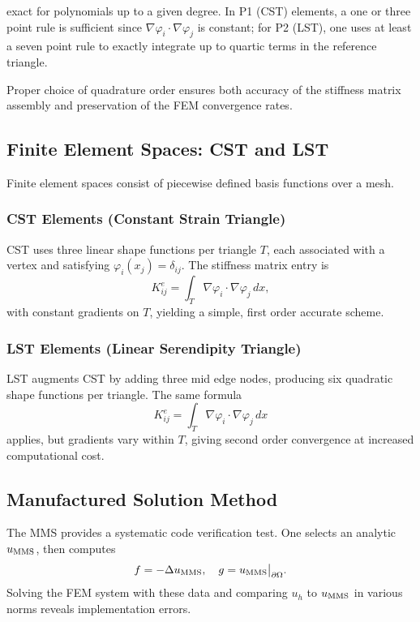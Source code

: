 exact for polynomials up to a given degree.  In P1 (CST) elements, a one or three point rule is sufficient since $\nabla\varphi_i\cdot\nabla\varphi_j$ is constant; for P2 (LST), one uses at least a seven point rule to exactly integrate up to quartic terms in the reference triangle.  

Proper choice of quadrature order ensures both accuracy of the stiffness matrix assembly and preservation of the FEM convergence rates. \citep{Dunavant1985}

\subsection{Finite Element Spaces: CST and LST}

Finite element spaces consist of piecewise defined basis functions over a mesh.

\subsubsection{CST Elements (Constant Strain Triangle)}

CST uses three linear shape functions per triangle $T$, each associated with a vertex and satisfying $\varphi_i(x_j)=\delta_{ij}$.  The stiffness matrix entry is
\begin{equation}
  K^e_{ij}=\int_T\nabla\varphi_i\cdot\nabla\varphi_j\,dx,
\end{equation}
with constant gradients on $T$, yielding a simple, first order accurate scheme. \citep{Zienkiewicz2005}

\subsubsection{LST Elements (Linear Serendipity Triangle)}

LST augments CST by adding three mid edge nodes, producing six quadratic shape functions per triangle.  The same formula
\begin{equation}
  K^e_{ij}=\int_T\nabla\varphi_i\cdot\nabla\varphi_j\,dx
\end{equation}
applies, but gradients vary within $T$, giving second order convergence at increased computational cost. \citep{Zienkiewicz2005}

\subsection{Manufactured Solution Method}

The MMS provides a systematic code verification test.  One selects an analytic $u_{\rm MMS}$, then computes
\begin{equation}
  f=-\Delta u_{\rm MMS},
  \quad
  g=u_{\rm MMS}\big|_{\partial\Omega}.
\end{equation}
Solving the FEM system with these data and comparing $u_h$ to $u_{\rm MMS}$ in various norms reveals implementation errors. \citep{Roache1998}

